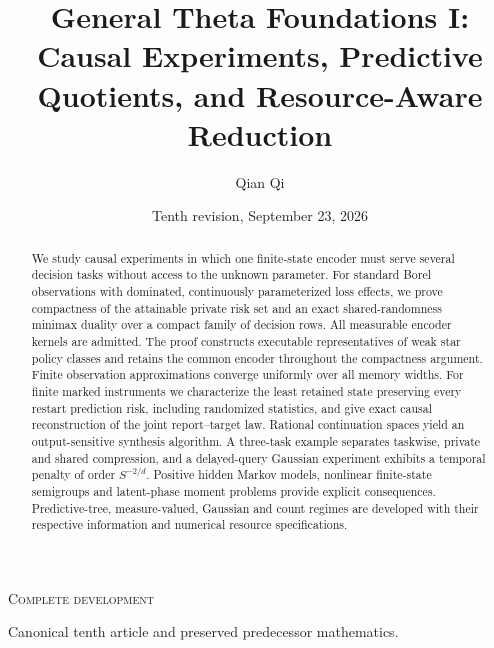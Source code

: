 
\newcommand{\Wone}{W_1}
\newcommand{\Del}{\Delta}
\newcommand{\emptyw}{\varnothing}
\newcommand{\osc}{\operatorname{osc}}
\newcommand{\diam}{\operatorname{diam}}
\newcommand{\Lipone}{\operatorname{Lip}_1}
\title[General Theta Foundations I]{General Theta Foundations I: Causal Experiments, Predictive Quotients, and Resource-Aware Reduction}
\author{Qian Qi}
\date{Tenth revision, September 23, 2026}

\begin{abstract}
We study causal experiments in which one finite-state encoder must serve
several decision tasks without access to the unknown parameter. For
standard Borel observations with dominated, continuously parameterized
loss effects, we prove compactness of the attainable private risk set
and an exact shared-randomness minimax duality over a compact family
of decision rows. All measurable encoder kernels are admitted. The
proof constructs executable representatives of weak star policy
classes and retains the common encoder throughout the compactness
argument. Finite observation approximations converge uniformly over
all memory widths. For finite marked instruments we characterize the
least retained state preserving every restart prediction risk, including
randomized statistics, and give exact causal reconstruction of the
joint report--target law. Rational continuation spaces yield an
output-sensitive synthesis algorithm. A three-task example separates
taskwise, private and shared compression, and a delayed-query Gaussian
experiment exhibits a temporal penalty of order $S^{-2/d}$. Positive
hidden Markov models, nonlinear finite-state semigroups and latent-phase
moment problems provide explicit consequences. Predictive-tree,
measure-valued, Gaussian and count regimes are developed with their
respective information and numerical resource specifications.
\end{abstract}
\maketitle
\ifcomplete
\begin{center}\small\textsc{Complete development}\par
Canonical tenth article and preserved predecessor mathematics.
\end{center}
\fi
\tableofcontents
